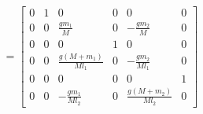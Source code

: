 \documentclass[preview]{standalone}
\begin{document}
\begin{align*}
= \left[\begin{matrix}0 & 1 & 0 & 0 & 0 & 0\\0 & 0 & \frac{g m_{1}}{M} & 0 & - \frac{g m_{2}}{M} & 0\\0 & 0 & 0 & 1 & 0 & 0\\0 & 0 & \frac{g \left(M + m_{1}\right)}{M l_{1}} & 0 & - \frac{g m_{2}}{M l_{1}} & 0\\0 & 0 & 0 & 0 & 0 & 1\\0 & 0 & - \frac{g m_{1}}{M l_{2}} & 0 & \frac{g \left(M + m_{2}\right)}{M l_{2}} & 0\end{matrix}\right]
\end{align*}
\end{document}
